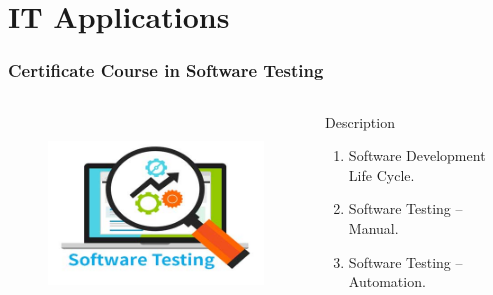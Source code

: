 \section{IT Applications} 
\begin{frame}
	\frametitle{Certificate Course in Software Testing}
		\begin{columns}
		
		
		\begin{figure}
			\includegraphics[width=200pt,height=150pt]{figures/course_st.jpg}
		\end{figure}
		
		
		\begin{block}{Description}
			
			\begin{enumerate}
				\item Software Development Life Cycle. 
				\item Software Testing – Manual.
				\item Software Testing – Automation.
			\end{enumerate}
			
		\end{block}
		
	\end{columns}
\end{frame}
